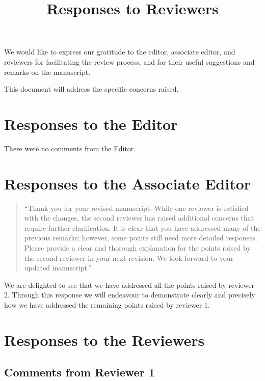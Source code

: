 \documentclass{article}
\title{Responses to Reviewers}
\author{}
\date{}
\begin{document}
\maketitle

We would like to express our gratitude to the editor, associate editor, and reviewers for facilitating the review process, and for their useful suggestions and remarks on the manuscript.

This document will address the specific concerns raised.

\section{Responses to the Editor}


There were no comments from the Editor.



\section{Responses to the Associate Editor}
\begin{quote}
``Thank you for your revised manuscript. While one reviewer is satisfied with
    the changes, the second reviewer has raised additional concerns that require
    further clarification. It is clear that you have addressed many of the
    previous remarks; however, some points still need more detailed responses.
    Please provide a clear and thorough explanation for the points raised by the
    second reviewer in your next revision. We look forward to your updated
    manuscript.''
\end{quote}

We are delighted to see that we have addressed all the points raised by reviewer
2. Through this response we will endeavour to demonstrate clearly and precisely
how we have addressed the remaining points raised by reviewer 1.

\section{Responses to the Reviewers}

\subsection{Comments from Reviewer 1}
\end{document}
